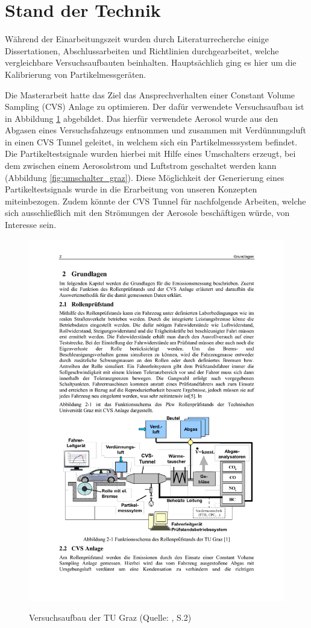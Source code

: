 \section{Stand der Technik}
W\"{a}hrend der Einarbeitungszeit wurden durch Literaturrecherche einige Dissertationen, Abschlussarbeiten und Richtlinien durchgearbeitet, welche vergleichbare Versuchsaufbauten beinhalten. Haupts\"{a}chlich ging es hier um die Kalibrierung von Partikelmessger\"{a}ten.

Die Masterarbeit \cite{auswertemethodik} hatte das Ziel das Ansprechverhalten einer Constant Volume Sampling (CVS) Anlage zu optimieren. Der daf\"{u}r verwendete Versuchsaufbau ist in Abbildung \ref{fig:aufbau_graz} abgebildet. Das hierf\"{u}r verwendete Aerosol wurde aus den Abgasen eines Versuchsfahzeugs entnommen und zusammen mit Verd\"{u}nnungsluft in einen CVS Tunnel geleitet, in welchem sich ein Partikelmesssystem befindet. Die Partikeltestsignale wurden hierbei mit Hilfe eines Umschalters erzeugt, bei dem zwischen einem Aerosolstrom und Luftstrom geschaltet werden kann (Abbildung \ref{fig:umschalter_graz}). Diese M\"{o}glichkeit der Generierung eines Partikeltestsignals wurde in die Erarbeitung von unseren Konzepten miteinbezogen. Zudem k\"{o}nnte der CVS Tunnel f\"{u}r nachfolgende Arbeiten, welche sich ausschlie{\ss}lich mit den Str\"{o}mungen der Aerosole besch\"{a}ftigen w\"{u}rde, von Interesse sein.

\begin{figure}[H]
	\myfloatalign
	{\includegraphics[width=.7\linewidth]{gfx/related/graz_versuch.pdf}} \quad
	\caption[Versuchsaufbau der TU Graz (Quelle: \cite{auswertemethodik}, S.2)]
	{Versuchsaufbau der TU Graz (Quelle: \cite{auswertemethodik}, S.2)}
	\label{fig:aufbau_graz}
\end{figure}

